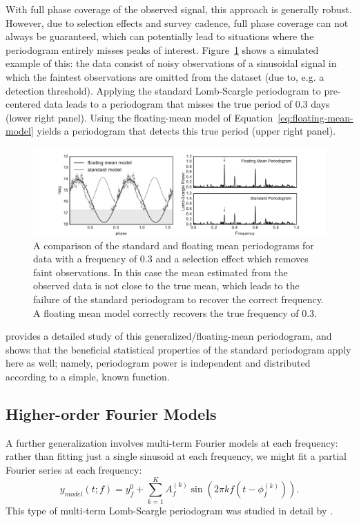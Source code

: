 \documentclass[preprint]{aastex}
\newcommand{\Fig}[1]{Figure~\ref{fig:#1}}
\newcommand{\figlabel}[1]{\label{fig:#1}}
\newcommand{\Eq}[1]{Equation~\ref{eq:#1}}
\newcommand{\eq}[1]{\Eq{#1}}
\begin{document}
With full phase coverage of the observed signal, this approach is generally
robust. However, due to selection effects and survey cadence, full phase
coverage can not always be guaranteed, which can potentially lead to situations
where the periodogram entirely misses peaks of interest.
\Fig{standard-vs-floatingmean} shows a simulated example of this: the data
consist of noisy observations of a sinusoidal signal in which the faintest
observations are omitted from the dataset (due to, {e.g.} a detection threshold).
Applying the standard Lomb-Scargle periodogram to pre-centered data leads to a
periodogram that misses the true period of 0.3 days (lower right panel).
Using the floating-mean model of \eq{floating-mean-model} yields a periodogram
that detects this true period (upper right panel).

\begin{figure}[ht]
  \centering
  \includegraphics[width=\textwidth]{fig20_standard_vs_floatingmean}
  \caption{A comparison of the standard and floating mean periodograms for
    data with a frequency of 0.3 and a selection effect which removes
    faint observations.
    In this case the mean estimated from the observed data is not close to
    the true mean, which leads to the failure of the standard periodogram to
    recover the correct frequency. A floating mean model correctly recovers
    the true frequency of 0.3.
    \figlabel{standard-vs-floatingmean}}
\end{figure}

\citet{Zechmeister09} provides a detailed study of this
generalized/floating-mean periodogram, and shows that the beneficial
statistical properties of the standard periodogram apply here as well;
namely, periodogram power is independent and distributed according to a
simple, known function.


\subsection{Higher-order Fourier Models}

A further generalization involves multi-term Fourier models at each frequency:
rather than fitting just a single sinusoid at each frequency, we might fit a
partial Fourier series at each frequency:
\begin{equation}
  y_{model}(t;f) = y^{0}_f + \sum_{k=1}^K A_f^{(k)} \sin(2\pi k f (t - \phi_f^{(k)})).
\end{equation}
This type of multi-term Lomb-Scargle periodogram was studied in detail by
\citet{Bretthorst88}.
\end{document}
